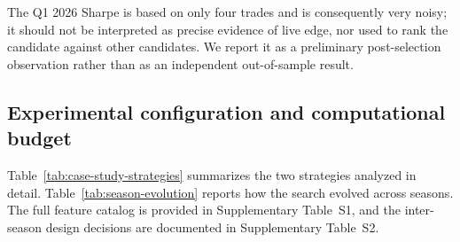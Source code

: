 \documentclass[11pt,a4paper]{article}
\begin{document}
The Q1 2026 Sharpe is based on only four trades and is consequently very noisy; it should not be interpreted as precise evidence of live edge, nor used to rank the candidate against other candidates. We report it as a preliminary post-selection observation rather than as an independent out-of-sample result.

\subsection{Experimental configuration and computational budget}\label{experimental-configuration}

Table~\ref{tab:case-study-strategies} summarizes the two strategies analyzed in detail. Table~\ref{tab:season-evolution} reports how the search evolved across seasons. The full feature catalog is provided in Supplementary Table~S1, and the inter-season design decisions are documented in Supplementary Table~S2.
\end{document}
